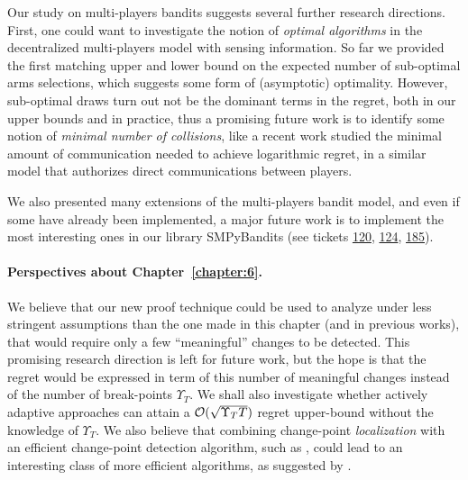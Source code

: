 Our study on multi-players bandits suggests several further research directions.
First, one could want to investigate the notion of \emph{optimal algorithms} in the decentralized multi-players model with sensing information.
So far we provided the first matching upper and lower bound on the expected number of sub-optimal arms selections, which suggests some form of (asymptotic) optimality.
However, sub-optimal draws turn out not be the dominant terms in the regret, both in our upper bounds and in practice, thus a promising future work is to identify some notion of \emph{minimal number of collisions}, like a recent work \cite{wang2019distributed} studied the minimal amount of communication needed to achieve logarithmic regret, in a similar model that authorizes direct communications between players.

We also presented many extensions of the multi-players bandit model,
and even if some have already been implemented, a major future work is to implement the most interesting ones in our library SMPyBandits
(see tickets \href{https://github.com/SMPyBandits/SMPyBandits/issues/120}{120}, \href{https://github.com/SMPyBandits/SMPyBandits/issues/124}{124}, \href{https://github.com/SMPyBandits/SMPyBandits/issues/185}{185}).


\paragraph{Perspectives about \textbf{Chapter~\ref{chapter:6}}.}

We believe that our new proof technique could be used to analyze \GLRklUCB{} under less stringent assumptions than the one made in this chapter (and in previous works), that would require only a few ``meaningful'' changes to be detected.
This promising research direction is left for future work,  but the hope is that the regret would be expressed in term of this number of meaningful changes instead of the number of break-points $\Upsilon_T$.
We shall also investigate whether actively adaptive approaches can attain a $\mathcal{O}(\sqrt{\Upsilon_T T})$ regret upper-bound without the knowledge of $\Upsilon_T$.
We also believe that combining change-point \emph{localization} with an efficient change-point detection algorithm, such as \GLRklUCB, could lead to an interesting class of more efficient algorithms, as suggested by \cite{Maillard2018GLR}.

